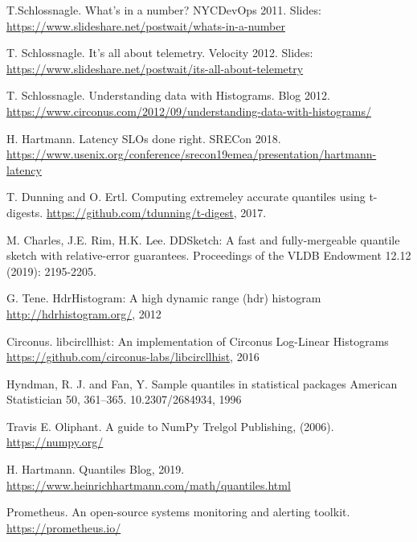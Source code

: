 \documentclass{article}
\theoremstyle{plain}
\theoremstyle{remark}
\begin{document}

\begin{thebibliography}{1}

  T.Schlossnagle.
  \newblock What's in a number?
  \newblock NYCDevOps 2011. Slides: \url{https://www.slideshare.net/postwait/whats-in-a-number}

  T. Schlossnagle.
  \newblock It's all about telemetry.
  \newblock Velocity 2012. Slides: \url{https://www.slideshare.net/postwait/its-all-about-telemetry}

  T. Schlossnagle.
  \newblock Understanding data with Histograms.
  \newblock Blog 2012. \url{https://www.circonus.com/2012/09/understanding-data-with-histograms/}

  H. Hartmann.
  \newblock Latency SLOs done right.
  \newblock SRECon 2018. \url{https://www.usenix.org/conference/srecon19emea/presentation/hartmann-latency}

  T. Dunning and O. Ertl.
  \newblock  Computing extremeley accurate quantiles using t-digests.
  \newblock \url{https://github.com/tdunning/t-digest}, 2017.

  M. Charles, J.E. Rim, H.K. Lee.
  \newblock DDSketch: A fast and fully-mergeable quantile sketch with relative-error guarantees.
  \newblock Proceedings of the VLDB Endowment 12.12 (2019): 2195-2205.

  G. Tene.
  \newblock HdrHistogram: A high dynamic range (hdr) histogram
  \newblock \url{http://hdrhistogram.org/}, 2012

  Circonus.
  \newblock libcircllhist: An implementation of Circonus Log-Linear Histograms
  \newblock \url{https://github.com/circonus-labs/libcircllhist}, 2016

  Hyndman, R. J. and Fan, Y.
  \newblock Sample quantiles in statistical packages
  \newblock American Statistician 50, 361–365. 10.2307/2684934, 1996

  Travis E. Oliphant.
  \newblock A guide to NumPy
  \newblock Trelgol Publishing, (2006). \url{https://numpy.org/}

  H. Hartmann.
  \newblock Quantiles
  \newblock Blog, 2019. \url{https://www.heinrichhartmann.com/math/quantiles.html}

  Prometheus.
  \newblock An open-source systems monitoring and alerting toolkit.
  \newblock \url{https://prometheus.io/}

\end{thebibliography}
\end{document}
